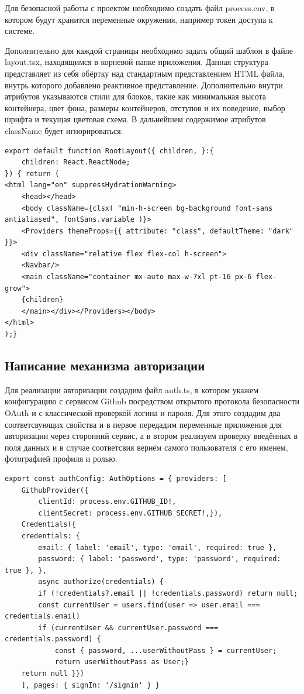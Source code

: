 \documentclass[master, och, pract]{SCWorks}
\begin{document}
Для безопасной работы с проектом необходимо создать файл process.env, в котором будут хранится переменные окружения, например токен доступа к системе.

Дополнительно для каждой страницы необходимо задать общий шаблон в файле layout.tsx, находящимся в корневой папке приложения. Данная структура представляет из себя обёртку над стандартным представлением HTML файла, внутрь которого добавлено реактивное представление. Дополнительно внутри атрибутов указываются стили для блоков, такие как минимальная высота контейнера, цвет фона, размеры контейнеров, отступов и их поведение, выбор шрифта и текущая цветовая схема. В дальнейшем содержимое атрибутов className будет  игнорироваться. 
\begin{verbatim}
export default function RootLayout({ children, }:{
	children: React.ReactNode;
}) { return (
<html lang="en" suppressHydrationWarning>  
    <head></head>
    <body className={clsx( "min-h-screen bg-background font-sans antialiased", fontSans.variable )}>
    <Providers themeProps={{ attribute: "class", defaultTheme: "dark" }}>
    <div className="relative flex flex-col h-screen">
    <Navbar/>
    <main className="container mx-auto max-w-7xl pt-16 px-6 flex-grow">
    {children}
    </main></div></Providers></body>
</html>
);}
\end{verbatim}




\subsection{Написание механизма авторизации}
Для реализации авторизации создадим файл auth.ts, в котором укажем конфигурацию с сервисом Github посредством открытого протокола безопасности OAuth и с классической проверкой логина и пароля. Для этого создадим два соответсвующих свойства и в первое передадим переменные приложения для авторизации через сторонний сервис, а в втором реализуем проверку введённых в поля данных и в случае соответсвия вернём самого пользователя с его именем, фотографией профиля и ролью.
\begin{verbatim}
export const authConfig: AuthOptions = { providers: [
    GithubProvider({
        clientId: process.env.GITHUB_ID!,
        clientSecret: process.env.GITHUB_SECRET!,}),
    Credentials({
    credentials: {
        email: { label: 'email', type: 'email', required: true },
        password: { label: 'password', type: 'password', required: true }, },
        async authorize(credentials) {
        if (!credentials?.email || !credentials.password) return null;
        const currentUser = users.find(user => user.email === credentials.email)
        if (currentUser && currentUser.password === credentials.password) {
            const { password, ...userWithoutPass } = currentUser;
            return userWithoutPass as User;}
    return null }})
    ], pages: { signIn: '/signin' } }
\end{verbatim}
\end{document}

